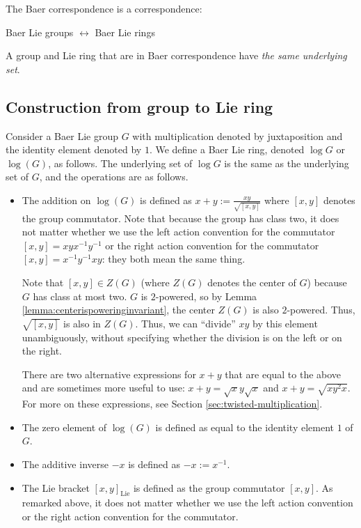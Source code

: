The Baer correspondence is a correspondence:

\begin{center}
  Baer Lie groups $\leftrightarrow$ Baer Lie rings
\end{center}

A group and Lie ring that are in Baer correspondence have {\em the
  same underlying set}.

\subsection{Construction from group to Lie ring}\label{sec:baer-group-to-lie-ring}

Consider a Baer Lie group $G$ with multiplication denoted by
juxtaposition and the identity element denoted by $1$. We define a
Baer Lie ring, denoted $\log G$ or $\log(G)$, as follows. The
underlying set of $\log G$ is the same as the underlying set of $G$,
and the operations are as follows.

\begin{itemize}
\item The addition on $\log(G)$ is defined as $x + y :=
  \frac{xy}{\sqrt{[x,y]}}$ where $[x,y]$ denotes the group
  commutator. Note that because the group has class two, it does not
  matter whether we use the left action convention for the commutator
  $[x,y] = xyx^{-1}y^{-1}$ or the right action convention for the
  commutator $[x,y] = x^{-1}y^{-1}xy$: they both mean the same thing.

  Note that $[x,y] \in Z(G)$ (where $Z(G)$ denotes the center of $G$)
  because $G$ has class at most two. $G$ is $2$-powered, so by Lemma
  \ref{lemma:centerispoweringinvariant}, the center $Z(G)$ is also
  $2$-powered. Thus, $\sqrt{[x,y]}$ is also in $Z(G)$. Thus, we can
  ``divide'' $xy$ by this element unambiguously, without specifying
  whether the division is on the left or on the right.

  There are two alternative expressions for $x + y$ that are equal to
  the above and are sometimes more useful to use: $x + y =
  \sqrt{x}y\sqrt{x}$ and $x + y = \sqrt{xy^2x}$. For more on these
  expressions, see Section \ref{sec:twisted-multiplication}.
\item The zero element of $\log(G)$ is defined as equal to the
  identity element $1$ of $G$.
\item The additive inverse $-x$ is defined as $-x := x^{-1}$.
\item The Lie bracket $[x,y]_{\text{Lie}}$ is defined as the group
  commutator $[x,y]$. As remarked above, it does not matter whether we
  use the left action convention or the right action convention for
  the commutator.
\end{itemize}


